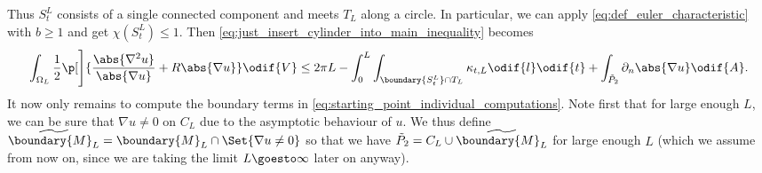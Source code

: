 \documentclass[titlepage,numbers=noenddot,oneside,%
cleardoublepage=empty,paper=a4,fontsize=11pt,%
english,%
]{scrartcl}
\begin{document}
Thus \( S_t^L \) consists of a single connected component and meets \( T_L \) along a circle. In particular, we can apply \cref{eq:def_euler_characteristic} with \( b\geq 1 \) and get \( \chi(S_t^L)\leq 1 \). Then \cref{eq:just_insert_cylinder_into_main_inequality} becomes
\begin{equation}
    \int_{\Omega_L} \frac{1}{2}\p[\Bigg]{\frac{\abs{\nabla^2 u}}{\abs{\nabla u}}+R\abs{\nabla u} }\odif{V} \leq2\pi L- \int_{0}^{L}\int _{\boundary{S_t^L} \cap T_L}\kappa_{t,L}\odif{l}\odif{t}+ \int_{\tilde{P}_2}\partial_{n} \abs{\nabla u}\odif{A}.\label{eq:starting_point_individual_computations}
\end{equation}
It now only remains to compute the boundary terms in \cref{eq:starting_point_individual_computations}. Note first that for large enough \( L \), we can be sure that \( \nabla u\neq 0 \) on \( C_L \) due to the asymptotic behaviour of \( u \). We thus define \( \widetilde{\boundary{M}_L}=\boundary{M}_L\cap \Set{\nabla u\neq 0} \) so that we have \( \tilde{P}_2=C_L\cup \widetilde{\boundary{M}_L} \) for large enough \( L \) (which we assume from now on, since we are taking the limit \( L\goesto \infty \) later on anyway).
\end{document}
